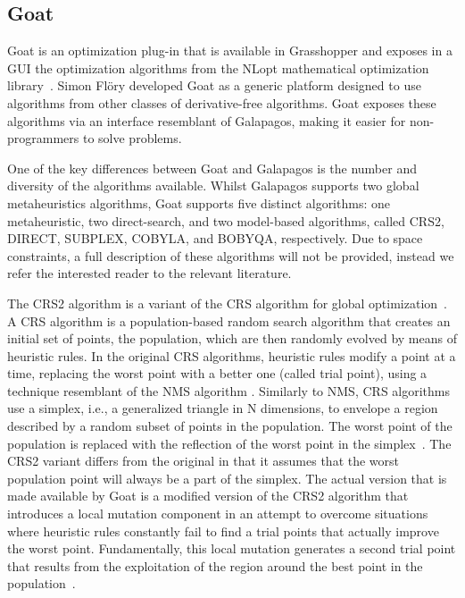 \subsection{Goat}
Goat is an optimization plug-in that is available in Grasshopper and exposes in a \ac{GUI} the optimization algorithms from the NLopt mathematical optimization library~\cite{NLOPT}. Simon Flöry developed Goat as a generic platform designed to use algorithms from other classes of derivative-free algorithms. Goat exposes these algorithms via an interface resemblant of Galapagos, making it easier for non-programmers to solve problems. 

One of the key differences between Goat and Galapagos is the number and diversity of the algorithms available. Whilst Galapagos supports two global metaheuristics algorithms, Goat supports five distinct algorithms: one metaheuristic, two direct-search, and two model-based algorithms, called CRS2, DIRECT, SUBPLEX, COBYLA, and BOBYQA, respectively. Due to space constraints, a full description of these algorithms will not be provided, instead we refer the interested reader to the relevant literature.  
	
The CRS2 algorithm is a variant of the \ac{CRS} algorithm for global optimization~\cite{Price1983}. A \ac{CRS} algorithm is a population-based random search algorithm that creates an initial set of points, the population, which are then randomly evolved by means of heuristic rules. In the original \ac{CRS} algorithms, heuristic rules modify a point at a time, replacing the worst point with a better one (called trial point), using a technique resemblant of the \ac{NMS} algorithm \cite{Nelder1964}. Similarly to \ac{NMS}, \ac{CRS} algorithms use a simplex, i.e., a generalized triangle in N dimensions, to envelope a region described by a random subset of points in the population. The worst point of the population is replaced with the reflection of the worst point in the simplex~\cite{Kaelo2006CRS2}. The CRS2 variant differs from the original in that it assumes that the worst population point will always be a part of the simplex. The actual version that is made available by Goat is a modified version of the CRS2 algorithm that introduces a local mutation component in an attempt to overcome situations where heuristic rules constantly fail to find a trial points that actually improve the worst point. Fundamentally, this local mutation generates a second trial point that results from the exploitation of the region around the best point in the population~\cite{Kaelo2006CRS2}.  

